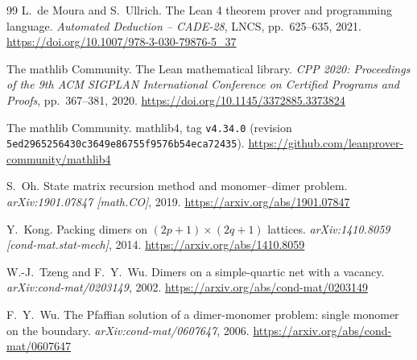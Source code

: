 \documentclass[11pt]{article}
\theoremstyle{definition}
\begin{document}
\begin{thebibliography}{99}
L.~de Moura and S.~Ullrich.
\newblock The Lean 4 theorem prover and programming language.
\newblock \emph{Automated Deduction -- CADE-28}, LNCS, pp.~625--635, 2021.
\url{https://doi.org/10.1007/978-3-030-79876-5_37}

The mathlib Community.
\newblock The Lean mathematical library.
\newblock \emph{CPP 2020: Proceedings of the 9th ACM SIGPLAN International
Conference on Certified Programs and Proofs}, pp.~367--381, 2020.
\url{https://doi.org/10.1145/3372885.3373824}

The mathlib Community.
\newblock mathlib4, tag \texttt{v4.34.0} (revision
\texttt{5ed29652}\allowbreak\texttt{56430c36}\allowbreak\texttt{49e86755}\allowbreak\texttt{f9576b54}\allowbreak\texttt{eca72435}).
\newblock \url{https://github.com/leanprover-community/mathlib4}

S.~Oh.
\newblock State matrix recursion method and monomer--dimer problem.
\newblock \emph{arXiv:1901.07847 [math.CO]}, 2019.
\url{https://arxiv.org/abs/1901.07847}

Y.~Kong.
\newblock Packing dimers on $(2p+1)\times(2q+1)$ lattices.
\newblock \emph{arXiv:1410.8059 [cond-mat.stat-mech]}, 2014.
\url{https://arxiv.org/abs/1410.8059}

W.-J.~Tzeng and F.~Y.~Wu.
\newblock Dimers on a simple-quartic net with a vacancy.
\newblock \emph{arXiv:cond-mat/0203149}, 2002.
\url{https://arxiv.org/abs/cond-mat/0203149}

F.~Y.~Wu.
\newblock The Pfaffian solution of a dimer-monomer problem: single monomer on
the boundary.
\newblock \emph{arXiv:cond-mat/0607647}, 2006.
\url{https://arxiv.org/abs/cond-mat/0607647}


\end{thebibliography}
\end{document}
